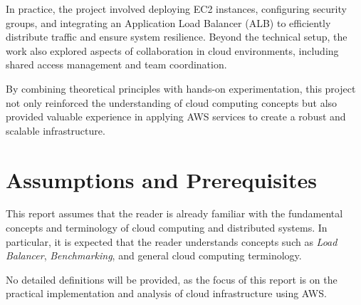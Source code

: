 \documentclass[a4paper,12pt]{article}
\begin{document}
	In practice, the project involved deploying EC2 instances, configuring security groups, and integrating an Application Load Balancer (ALB) to efficiently distribute traffic and ensure system resilience. Beyond the technical setup, the work also explored aspects of collaboration in cloud environments, including shared access management and team coordination.
	
	By combining theoretical principles with hands-on experimentation, this project not only reinforced the understanding of cloud computing concepts but also provided valuable experience in applying AWS services to create a robust and scalable infrastructure.
	
	\section{Assumptions and Prerequisites}
	
	This report assumes that the reader is already familiar with the fundamental concepts and terminology of cloud computing and distributed systems. In particular, it is expected that the reader understands concepts such as \textit{Load Balancer}, \textit{Benchmarking}, and general cloud computing terminology.
		
	No detailed definitions will be provided, as the focus of this report is on the practical implementation and analysis of cloud infrastructure using AWS.
	
\end{document}
